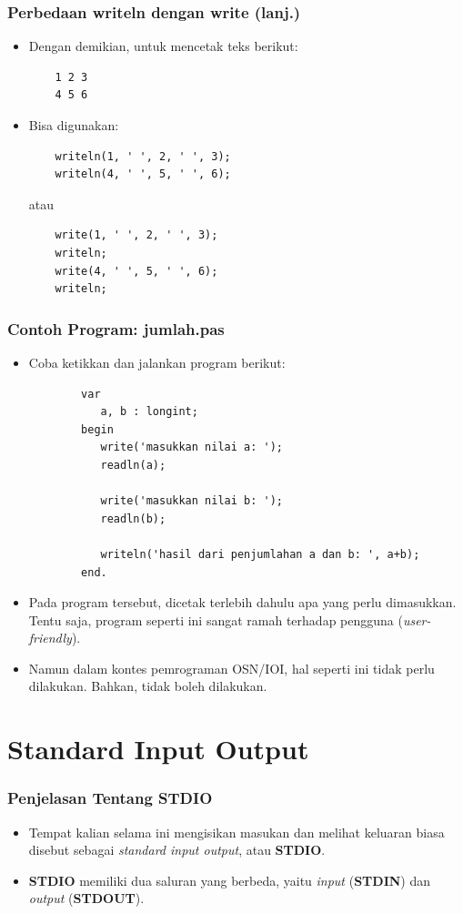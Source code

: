 \documentclass{beamer}
\begin{document}
\begin{frame}[fragile]
\frametitle{Perbedaan writeln dengan write (lanj.)}
\begin{itemize}
    \item Dengan demikian, untuk mencetak teks berikut:
    \begin{lstlisting}
    1 2 3
    4 5 6
    \end{lstlisting}
    \item Bisa digunakan:
    \begin{lstlisting}
    writeln(1, ' ', 2, ' ', 3);
    writeln(4, ' ', 5, ' ', 6);
    \end{lstlisting}
    atau
    \begin{lstlisting}
    write(1, ' ', 2, ' ', 3);
    writeln;
    write(4, ' ', 5, ' ', 6);
    writeln;
    \end{lstlisting}
\end{itemize}
\end{frame}

\begin{frame}[fragile]
\frametitle{Contoh Program: jumlah.pas}
\begin{itemize}
    \item Coba ketikkan dan jalankan program berikut:
    \begin{lstlisting}
        var
           a, b : longint;
        begin
           write('masukkan nilai a: ');
           readln(a);

           write('masukkan nilai b: ');
           readln(b);

           writeln('hasil dari penjumlahan a dan b: ', a+b);
        end.
    \end{lstlisting}
    \item Pada program tersebut, dicetak terlebih dahulu apa yang perlu dimasukkan. Tentu saja, program seperti ini sangat ramah terhadap pengguna (\textit{user-friendly}).
    \item Namun dalam kontes pemrograman OSN/IOI, hal seperti \newline ini tidak perlu dilakukan. Bahkan, tidak boleh dilakukan.
\end{itemize}
\end{frame}

\section{Standard Input Output}
\frame{\sectionpage}

\begin{frame}
\frametitle{Penjelasan Tentang STDIO}
\begin{itemize}
    \item Tempat kalian selama ini mengisikan masukan dan melihat keluaran biasa disebut sebagai \textit{standard input output}, atau \textbf{STDIO}.
    \item \textbf{STDIO} memiliki dua saluran yang berbeda, yaitu \textit{input} (\textbf{STDIN}) dan \textit{output} (\textbf{STDOUT}).
\end{itemize}
\end{frame}
\end{document}
